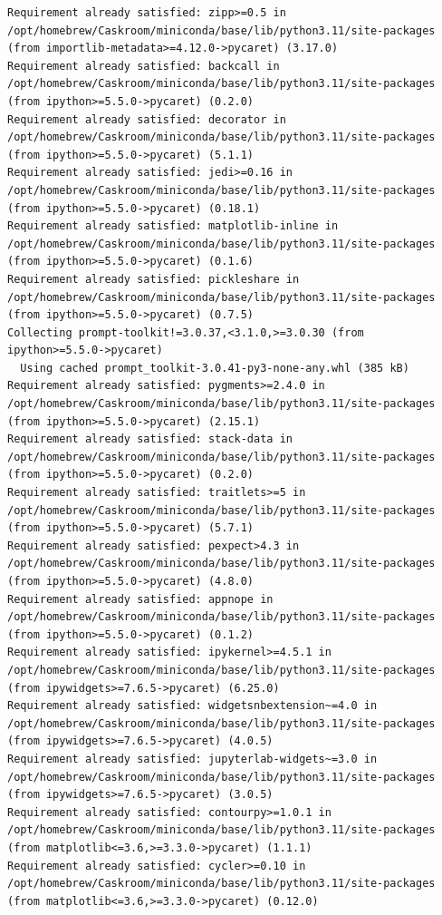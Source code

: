 \documentclass[
  letterpaper,
  DIV=11,
  numbers=noendperiod]{scrartcl}
\begin{document}
\begin{verbatim}
Requirement already satisfied: zipp>=0.5 in /opt/homebrew/Caskroom/miniconda/base/lib/python3.11/site-packages (from importlib-metadata>=4.12.0->pycaret) (3.17.0)
Requirement already satisfied: backcall in /opt/homebrew/Caskroom/miniconda/base/lib/python3.11/site-packages (from ipython>=5.5.0->pycaret) (0.2.0)
Requirement already satisfied: decorator in /opt/homebrew/Caskroom/miniconda/base/lib/python3.11/site-packages (from ipython>=5.5.0->pycaret) (5.1.1)
Requirement already satisfied: jedi>=0.16 in /opt/homebrew/Caskroom/miniconda/base/lib/python3.11/site-packages (from ipython>=5.5.0->pycaret) (0.18.1)
Requirement already satisfied: matplotlib-inline in /opt/homebrew/Caskroom/miniconda/base/lib/python3.11/site-packages (from ipython>=5.5.0->pycaret) (0.1.6)
Requirement already satisfied: pickleshare in /opt/homebrew/Caskroom/miniconda/base/lib/python3.11/site-packages (from ipython>=5.5.0->pycaret) (0.7.5)
Collecting prompt-toolkit!=3.0.37,<3.1.0,>=3.0.30 (from ipython>=5.5.0->pycaret)
  Using cached prompt_toolkit-3.0.41-py3-none-any.whl (385 kB)
Requirement already satisfied: pygments>=2.4.0 in /opt/homebrew/Caskroom/miniconda/base/lib/python3.11/site-packages (from ipython>=5.5.0->pycaret) (2.15.1)
Requirement already satisfied: stack-data in /opt/homebrew/Caskroom/miniconda/base/lib/python3.11/site-packages (from ipython>=5.5.0->pycaret) (0.2.0)
Requirement already satisfied: traitlets>=5 in /opt/homebrew/Caskroom/miniconda/base/lib/python3.11/site-packages (from ipython>=5.5.0->pycaret) (5.7.1)
Requirement already satisfied: pexpect>4.3 in /opt/homebrew/Caskroom/miniconda/base/lib/python3.11/site-packages (from ipython>=5.5.0->pycaret) (4.8.0)
Requirement already satisfied: appnope in /opt/homebrew/Caskroom/miniconda/base/lib/python3.11/site-packages (from ipython>=5.5.0->pycaret) (0.1.2)
Requirement already satisfied: ipykernel>=4.5.1 in /opt/homebrew/Caskroom/miniconda/base/lib/python3.11/site-packages (from ipywidgets>=7.6.5->pycaret) (6.25.0)
Requirement already satisfied: widgetsnbextension~=4.0 in /opt/homebrew/Caskroom/miniconda/base/lib/python3.11/site-packages (from ipywidgets>=7.6.5->pycaret) (4.0.5)
Requirement already satisfied: jupyterlab-widgets~=3.0 in /opt/homebrew/Caskroom/miniconda/base/lib/python3.11/site-packages (from ipywidgets>=7.6.5->pycaret) (3.0.5)
Requirement already satisfied: contourpy>=1.0.1 in /opt/homebrew/Caskroom/miniconda/base/lib/python3.11/site-packages (from matplotlib<=3.6,>=3.3.0->pycaret) (1.1.1)
Requirement already satisfied: cycler>=0.10 in /opt/homebrew/Caskroom/miniconda/base/lib/python3.11/site-packages (from matplotlib<=3.6,>=3.3.0->pycaret) (0.12.0)

\end{verbatim}
\end{document}
